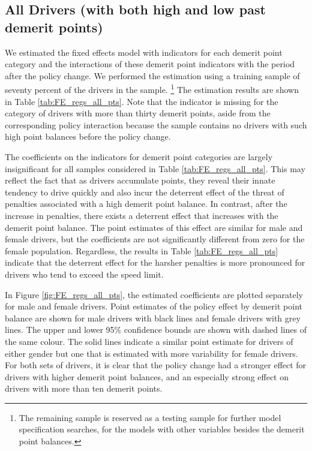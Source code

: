 \documentclass[12pt]{paper}
\begin{document}
\subsection*{All Drivers (with both high and low past demerit points)}

We estimated the fixed effects model with indicators for each demerit point category
and the interactions of these demerit point indicators with the period after the policy change. 
We performed the estimation using a training sample of seventy percent of the drivers in the sample.%
\footnote{The remaining sample is reserved as a testing sample for further model specification searches, for the models with other variables besides the demerit point balances. }
The estimation results are shown in Table \ref{tab:FE_regs_all_pts}. 
% 
Note that the indicator is missing for the category of drivers with more than thirty demerit points, 
aside from the corresponding policy interaction because the sample contains no drivers with such high point balances before the policy change. 
% 



The coefficients on the indicators for demerit point categories are largely insignificant for all samples considered in Table \ref{tab:FE_regs_all_pts}. 
This may reflect the fact that as drivers accumulate points, they reveal their innate tendency to drive quickly and also incur the deterrent effect of the threat of penalties associated with a high demerit point balance. 
In contrast, after the increase in penalties, there exists a deterrent effect that increases with the demerit point balance. 
The point estimates of this effect are similar for male and female drivers, 
but the coefficients are not significantly different from zero for the female population. 
Regardless, the results in Table \ref{tab:FE_regs_all_pts} indicate that the deterrent effect
for the harsher penalties is more pronounced for drivers who tend to exceed the speed limit. 


% 






In Figure \ref{fig:FE_regs_all_pts}, the estimated coefficients are plotted separately for male and female drivers. 
Point estimates of the policy effect by demerit point balance are shown for male drivers with black lines and female drivers with grey lines. 
The upper and lower 95\% confidence bounds are shown with dashed lines of the same colour. 
The solid lines indicate a similar point estimate for drivers of either gender but one that is estimated with more variability for female drivers. 
For both sets of drivers, it is clear that the policy change had a stronger effect for drivers with 
higher demerit point balances, and an especially strong effect on drivers with more than ten demerit points. 
\end{document}

